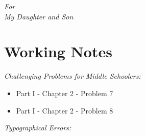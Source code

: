 \documentclass[10pt]{article}
\begin{document}

\clearpage

\thispagestyle{empty}

\vspace*{\fill}

\begin{center}

    \textit{For}\\[0.5em]

    \textit{My Daughter and Son}

\end{center}

\vspace*{\fill}



\clearpage

\tableofcontents



\clearpage

\section*{Working Notes}



\textit{Challenging Problems for Middle Schoolers:}
\begin{itemize}
  \item Part I - Chapter 2 - Problem 7
  \item Part I - Chapter 2 - Problem 8
\end{itemize}

\vspace{1em}


\textit{Typographical Errors:}
\end{document}
